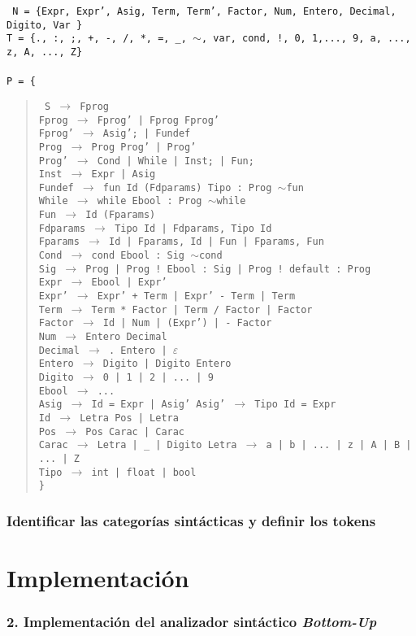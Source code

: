 \documentclass[12pt]{article}
\begin{document}
\noindent
\noindent
\texttt{
  \noindent
N = \{Expr, Expr', Asig, Term, Term', Factor, Num, Entero, Decimal, Digito, Var \}\\
T = \{., :, ;, +, -, /, *, =, \_, $\sim$, var, cond, !, 0, 1,..., 9, a, ..., z, A, ..., Z\}\\ \\ 
P = \{}
\begin{quote}
  \texttt{
    S $\to$ Fprog\\
    Fprog $\to$ Fprog' | Fprog Fprog' \\
    Fprog' $\to$ Asig'; | Fundef \\
    Prog $\to$ Prog Prog' | Prog' \\
    Prog' $\to$ Cond | While | Inst; | Fun; \\
    Inst $\to$ Expr | Asig\\
    Fundef $\to$ fun Id (Fdparams) Tipo : Prog $\sim$fun\\
    While $\to$ while Ebool : Prog $\sim$while\\    
    Fun $\to$ Id (Fparams)\\
    Fdparams $\to$ Tipo Id | Fdparams, Tipo Id\\
    Fparams $\to$ Id | Fparams, Id | Fun | Fparams, Fun\\
    Cond $\to$ cond Ebool : Sig $\sim$cond \\
    Sig $\to$ Prog | Prog ! Ebool : Sig | Prog ! default : Prog \\    
    Expr $\to$ Ebool | Expr'  \\
    Expr' $\to$ Expr' + Term | Expr' - Term | Term \\
    Term $\to$ Term * Factor | Term / Factor | Factor \\
    Factor $\to$ Id | Num | (Expr') | - Factor \\
    Num $\to$ Entero Decimal \\
    Decimal $\to$ . Entero | $\varepsilon$ \\
    Entero $\to$ Digito | Digito Entero \\
    Digito $\to$ 0 | 1 | 2 | ... | 9 \\
    Ebool $\to$ ... \\
    Asig $\to$  Id = Expr | Asig'
    Asig' $\to$ Tipo Id = Expr \\
    Id  $\to$ Letra Pos | Letra \\
    Pos  $\to$ Pos Carac | Carac \\
    Carac $\to$ Letra | \_ | Digito
    Letra $\to$ a | b | ... | z | A | B | ... | Z \\
    Tipo $\to$ int | float | bool \\
    \}
}
 
\end{quote}

\subsubsection*{Identificar las categorías sintácticas y definir los tokens}

\section{Implementación}
\subsubsection*{2. Implementación del analizador sintáctico \textit{Bottom-Up}}
\end{document}
